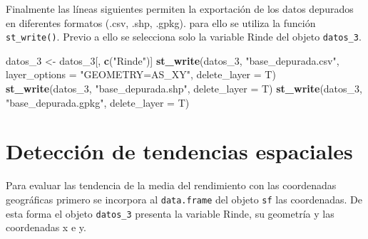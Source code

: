 \documentclass[11pt,b5paper,]{krantz}
\newenvironment{Shaded}{}{}
\newcommand{\KeywordTok}[1]{\textcolor[rgb]{0.00,0.44,0.13}{\textbf{#1}}}
\newcommand{\DataTypeTok}[1]{\textcolor[rgb]{0.56,0.13,0.00}{#1}}
\newcommand{\DecValTok}[1]{\textcolor[rgb]{0.25,0.63,0.44}{#1}}
\newcommand{\StringTok}[1]{\textcolor[rgb]{0.25,0.44,0.63}{#1}}
\newcommand{\NormalTok}[1]{#1}
\begin{document}
Finalmente las líneas siguientes permiten la exportación de los datos
depurados en diferentes formatos (.csv, .shp, .gpkg). para ello se
utiliza la función \texttt{st\_write()}. Previo a ello se selecciona
solo la variable Rinde del objeto \texttt{datos\_3}.

\begin{Shaded}
\begin{Highlighting}[]
\NormalTok{datos_}\DecValTok{3}\NormalTok{ <-}\StringTok{ }\NormalTok{datos_}\DecValTok{3}\NormalTok{[, }\KeywordTok{c}\NormalTok{(}\StringTok{"Rinde"}\NormalTok{)]}
\KeywordTok{st_write}\NormalTok{(datos_}\DecValTok{3}\NormalTok{,}
         \StringTok{"base_depurada.csv"}\NormalTok{,}
         \DataTypeTok{layer_options =} \StringTok{"GEOMETRY=AS_XY"}\NormalTok{,}
         \DataTypeTok{delete_layer =}\NormalTok{ T)}
\KeywordTok{st_write}\NormalTok{(datos_}\DecValTok{3}\NormalTok{, }
         \StringTok{"base_depurada.shp"}\NormalTok{, }
         \DataTypeTok{delete_layer =}\NormalTok{ T)}
\KeywordTok{st_write}\NormalTok{(datos_}\DecValTok{3}\NormalTok{, }
         \StringTok{"base_depurada.gpkg"}\NormalTok{, }
         \DataTypeTok{delete_layer =}\NormalTok{ T)}
\end{Highlighting}
\end{Shaded}

\section{Detección de tendencias
espaciales}\label{detecciuxf3n-de-tendencias-espaciales}

Para evaluar las tendencia de la media del rendimiento con las
coordenadas geográficas primero se incorpora al \texttt{data.frame} del
objeto \texttt{sf} las coordenadas. De esta forma el objeto
\texttt{datos\_3} presenta la variable Rinde, su geometría y las
coordenadas x e y.
\end{document}
